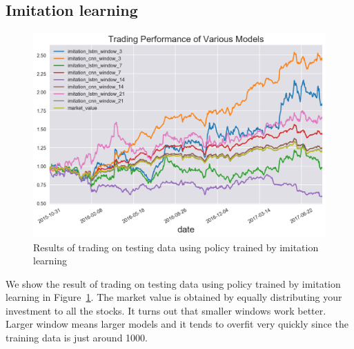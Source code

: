 \documentclass[a4paper, 10pt]{article}
\begin{document}
\begin{spacing}{1.2}
    \subsection{Imitation learning}
    \begin{figure}[htbp]
      \centering
      \includegraphics[scale=0.7]{imitation_result}
      \caption{Results of trading on testing data using policy trained by imitation learning}
      \label{fig:imitation_learning}
    \end{figure}
    We show the result of trading on testing data using policy trained by imitation learning in Figure~\ref{fig:imitation_learning}. The market value is obtained by equally distributing your investment to all the stocks. It turns out that smaller windows work better. Larger window means larger models and it tends to overfit very quickly since the training data is just around 1000.
    

\end{spacing}
\end{document}
